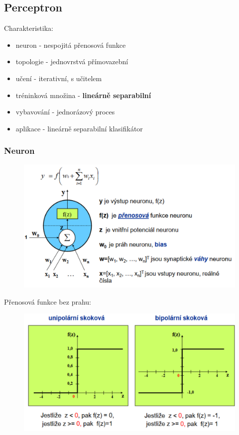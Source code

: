 \subsection*{Perceptron}
Charakteristika:
\begin{itemize}
    \item neuron - nespojitá přenosová funkce
    \item topologie - jednovrstvá přímovazební
    \item učení - iterativní, s učitelem
    \item tréninková množina - \textbf{lineárně separabilní}
    \item vybavování - jednorázový proces
    \item aplikace - lineárně separabilní klasifikátor
\end{itemize}
\subsubsection*{Neuron}
\begin{figure}[H]
    \includegraphics[scale = 0.3]{images/perceptron_neuron.png}
\end{figure}
\newpage
Přenosová funkce bez prahu:
\begin{figure}[H]
    \includegraphics[scale = 0.3]{images/perceptron_prenos.png}
\end{figure}

